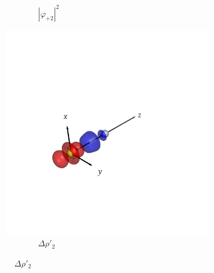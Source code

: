 \documentclass[journal=inoraj,manuscript=article]{achemso}
\begin{document}
\begin{figure}[!h]
\begin{subfigure}[t]{0.30\textwidth}
        \caption*{\ \ \ \ \ \ \ \ $|\varphi_{+2}|^2$}
    \end{subfigure}
    \hfill
    \begin{subfigure}[t]{0.30\textwidth}
        \centering
        \includegraphics[width=\linewidth]{./AuHg+/pair3.png} 
        \caption*{\ \ \ \ \ \ \ \ $\Delta \rho'_2$} 
    \end{subfigure}


\end{figure}
\end{document}
